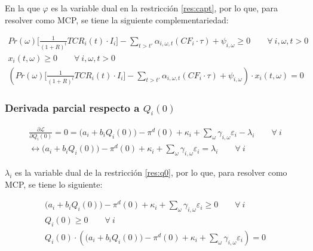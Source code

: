 En la que $\varphi$ es la variable dual en la restricción \ref{res:capt}, por lo que, para resolver como MCP, se tiene la siguiente complementariedad:


\begin{footnotesize}
\begin{align}
    Pr(\omega) \Bigg[\frac{1}{(1+R)^t}TCR_i(t) \cdot I_i \Bigg] - \sum_{t> t\prime}\alpha_{i,\omega,t} ( CF_i \cdot \tau)+ \psi_{i,\omega} \geq 0 \qquad  \forall \  i, \omega, t> 0\\
    x_i(t,\omega) \geq 0 \qquad  \forall \  i, \omega, t> 0\\
    (Pr(\omega) \Bigg[\frac{1}{(1+R)^t}TCR_i(t) \cdot I_i \Bigg] - \sum_{t> t\prime}\alpha_{i,\omega,t} ( CF_i \cdot \tau)+ \psi_{i,\omega})\cdot x_i(t,\omega)=0
\end{align}

\end{footnotesize}


\subsubsection{Derivada parcial respecto a $Q_i(0)$}
\begin{footnotesize}
\begin{align}
    \frac{\partial \mathcal{L} }{\partial Q_i(0)}= 0 =  \big(a_{i}+b_i Q_{i}(0)\big)-\pi^d(0) + \kappa_i  + \sum_{\omega} \gamma_{i,\omega}\varepsilon_i-\lambda_i \qquad \forall \  i  \\
     \leftrightarrow \big(a_{i}+b_i Q_{i}(0)\big)-\pi^d(0) + \kappa_i  + \sum_{\omega} \gamma_{i,\omega}\varepsilon_i = \lambda_i \qquad \forall \  i
\end{align}

\end{footnotesize}

$\lambda_i$ es la variable dual de la restricción \ref{res:q0}, por lo que, para resolver como MCP, se tiene lo siguiente:

\begin{footnotesize}
\begin{align}
    \big(a_{i}+b_i Q_{i}(0)\big)-\pi^d(0) + \kappa_i  + \sum_{\omega} \gamma_{i,\omega}\varepsilon_i \geq 0 \qquad \forall \  i  \\
    Q_i(0) \geq 0 \qquad \forall \  i  \\
    Q_i(0)\cdot ( \big(a_{i}+b_i Q_{i}(0)\big)-\pi^d(0) + \kappa_i  + \sum_{\omega} \gamma_{i,\omega}\varepsilon_i)=0 
\end{align}

\end{footnotesize}



